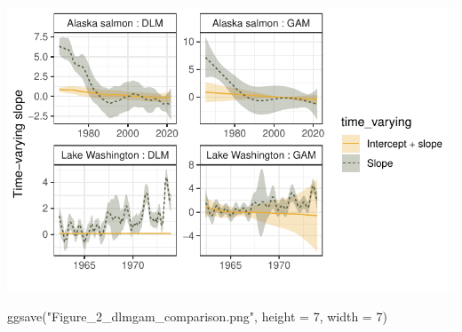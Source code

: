 \documentclass[
  letterpaper,
  DIV=11,
  numbers=noendperiod]{scrartcl}
\newenvironment{Shaded}{\begin{snugshade}}{\end{snugshade}}
\newcommand{\AttributeTok}[1]{\textcolor[rgb]{0.40,0.45,0.13}{#1}}
\newcommand{\DecValTok}[1]{\textcolor[rgb]{0.68,0.00,0.00}{#1}}
\newcommand{\FunctionTok}[1]{\textcolor[rgb]{0.28,0.35,0.67}{#1}}
\newcommand{\NormalTok}[1]{\textcolor[rgb]{0.00,0.23,0.31}{#1}}
\newcommand{\StringTok}[1]{\textcolor[rgb]{0.13,0.47,0.30}{#1}}
\begin{document}
\includegraphics{dlm_gam_comparison_files/figure-pdf/unnamed-chunk-6-1.pdf}

\begin{Shaded}
\begin{Highlighting}[]
\FunctionTok{ggsave}\NormalTok{(}\StringTok{"Figure\_2\_dlmgam\_comparison.png"}\NormalTok{, }\AttributeTok{height =} \DecValTok{7}\NormalTok{, }\AttributeTok{width =} \DecValTok{7}\NormalTok{)}
\end{Highlighting}
\end{Shaded}
\end{document}
